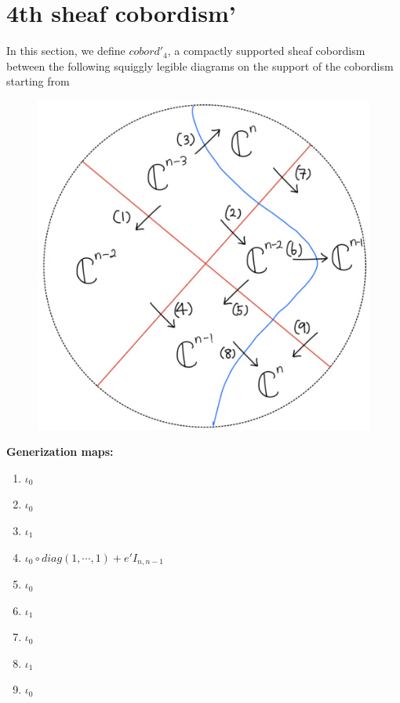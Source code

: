 \section{4th sheaf cobordism'}
In this section, we define $cobord'_4$, a compactly supported sheaf cobordism between the following squiggly legible diagrams on the support of the cobordism starting from
\begin{figure}[H]
    \centering
    \includegraphics[scale = 0.45]{diagrams/cobord'4/21.png}
    \caption{}
    \label{fig:your-label}
\end{figure}
\textbf{Generization maps:}
\begin{enumerate}[label = (\arabic*)]
\item $\iota_0$

\item $\iota_0$

\item $\iota_1$

\item $\iota_0 \circ diag(1,\cdots,1)+e'I_{n,n-1}$

\item $\iota_0$

\item $\iota_1$

\item $\iota_0$

\item $\iota_1$

\item $\iota_0$
\end{enumerate}

